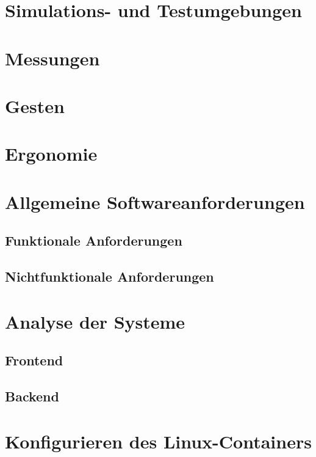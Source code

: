 \section{Simulations- und Testumgebungen}


\section{Messungen}


\section{Gesten}


\section{Ergonomie}





\section{Allgemeine Softwareanforderungen}


\subsection{Funktionale Anforderungen}


\subsection{Nichtfunktionale Anforderungen}


\section{Analyse der Systeme}


\subsection{Frontend}


\subsection{Backend}


\section{Konfigurieren des Linux-Containers}



